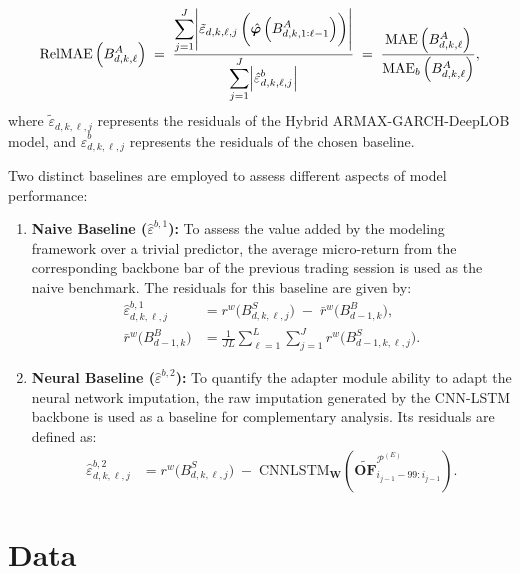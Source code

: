 \documentclass[10pt,a4paper,oneside]{article}
\DeclarePairedDelimiter{\aval}{\lvert}{\rvert} %
\begin{document}
\[
    \mathrm{RelMAE}\left( B^A_{d, k, \ell} \right)
    \;=\;
    \frac{\displaystyle\sum_{j=1}^{J} \aval*{\tilde{\varepsilon}_{d, k, \ell, j}\left( \hat{\boldsymbol{\varphi}} \left( B^A_{d,k,1:\ell - 1} \right) \right)}}{\displaystyle\sum_{j=1}^{J} \aval*{\hat{\varepsilon}^b_{d, k, \ell, j}}}
    \;=\;
    \frac{\mathrm{MAE}\left( B^A_{d, k, \ell} \right)}{\mathrm{MAE}_{b}\left( B^A_{d, k, \ell} \right)},
\]
where $\tilde{\varepsilon}_{d, k, \ell, j}$ represents the residuals of the Hybrid ARMAX-GARCH-DeepLOB model, and $\hat{\varepsilon}^b_{d, k, \ell, j}$ represents the residuals of the chosen baseline.

Two distinct baselines are employed to assess different aspects of model performance:

\begin{enumerate}
    \item \textbf{Naive Baseline ($\hat{\varepsilon}^{b,1}$):} To assess the value added by the modeling framework over a trivial predictor, the average micro-return from the corresponding backbone bar of the previous trading session is used as the naive benchmark. The residuals for this baseline are given by:
          \begin{align*}
              \hat{\varepsilon}^{b, 1}_{d,k,\ell,j} & = r^w\bigl(B^S_{d,k,\ell,j}\bigr) \;-\; \bar{r}^w\bigl(B^B_{d - 1, k}\bigr),         \\
              \bar{r}^w\bigl(B^B_{d - 1, k}\bigr)   & = \frac{1}{JL} \sum_{\ell = 1}^L \sum_{j = 1}^J r^w\bigl(B^S_{d - 1,k,\ell,j}\bigr).
          \end{align*}

    \item \textbf{Neural Baseline ($\hat{\varepsilon}^{b,2}$):} To quantify the adapter module ability to adapt the neural network imputation, the raw imputation generated by the CNN-LSTM backbone is used as a baseline for complementary analysis. Its residuals are defined as:
          \begin{align*}
              \hat{\varepsilon}^{b, 2}_{d,k,\ell,j} & = r^w\bigl(B^S_{d,k,\ell,j}\bigr) \;-\; \mathrm{CNNLSTM}_{\mathbf{W}}\!\left(\widetilde{\mathbf{OF}}^{\mathcal{P}^{(E)}}_{i_{j-1}-99:i_{j-1}}\right).
          \end{align*}
\end{enumerate}


\section{Data}
\label{sec:data}
\end{document}
